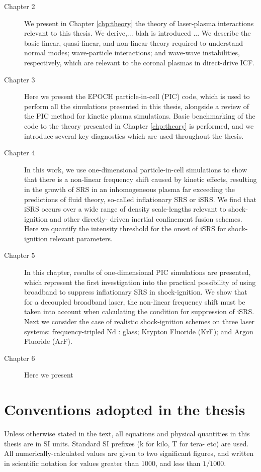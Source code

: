 \begin{description}
	\item[Chapter 2] We present in Chapter \ref{chp:theory} the theory of laser-plasma interactions relevant to this thesis. We derive,... blah is introduced ... We describe the basic linear, quasi-linear, and non-linear theory required to understand normal modes; wave-particle interactions; and wave-wave instabilities, respectively, which are relevant to the coronal plasmas in direct-drive ICF.
	
	\item[Chapter 3] Here we present the EPOCH particle-in-cell (\acrshort{PIC}) code, which is used to perform all the simulations presented in this thesis, alongside a review of the PIC method for kinetic plasma simulations. Basic benchmarking of the code to the theory presented in Chapter \ref{chp:theory} is performed, and we introduce several key diagnostics which are used throughout the thesis.
	 
	\item[Chapter 4] In this work, we use one-dimensional particle-in-cell 		
		simulations to show that there is a non-linear frequency shift caused  
		by kinetic effects, resulting in the growth of SRS in an inhomogeneous 
		plasma far exceeding the predictions of fluid theory, so-called 
		inflationary SRS or iSRS. We find that iSRS occurs over a wide range of 
		density scale-lengths relevant to shock-ignition and other directly-
		driven inertial confinement fusion schemes. Here we quantify the 
		intensity threshold for the onset of iSRS for shock-ignition relevant 
		parameters.
	\item[Chapter 5] In this chapter, results of one-dimensional PIC simulations are presented, which represent the first investigation into the practical possibility of using broadband to suppress inflationary SRS in shock-ignition. We show that for a decoupled broadband laser, the non-linear frequency shift must be taken into account when calculating the condition for suppression of iSRS. Next we consider the case of realistic shock-ignition schemes on three laser systems: frequency-tripled Nd : glass; Krypton Fluoride (KrF); and Argon Fluoride (ArF).
	\item[Chapter 6] Here we present 
\end{description}

\section*{Conventions adopted in the thesis}
Unless otherwise stated in the text, all equations and physical quantities in this thesis are in SI units. Standard SI prefixes (k for kilo, T for tera- etc) are used. All numerically-calculated values are given to two significant figures, and written in scientific notation for values greater than 1000, and less than $1/1000$.

%
%
